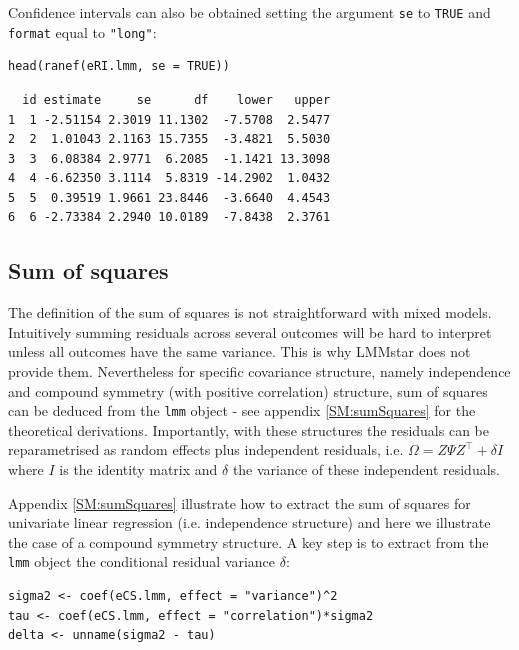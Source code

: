 \documentclass[12pt]{article}
\newcommand\Warning[1][3ex]{%
\renewcommand\stacktype{L}%
\scaleto{\stackon[1.3pt]{\color{red}$\triangle$}{\tiny\bfseries !}}{#1}%
\xspace
}
\newcommand\trans[1]{{#1}^\intercal}%
\begin{document}
Confidence intervals can also be obtained setting the argument \texttt{se} to
\texttt{TRUE} and \texttt{format} equal to \texttt{"long"}:
\lstset{language=r,label= ,caption= ,captionpos=b,numbers=none}
\begin{lstlisting}
head(ranef(eRI.lmm, se = TRUE))
\end{lstlisting}

\begin{verbatim}
  id estimate     se      df    lower   upper
1  1 -2.51154 2.3019 11.1302  -7.5708  2.5477
2  2  1.01043 2.1163 15.7355  -3.4821  5.5030
3  3  6.08384 2.9771  6.2085  -1.1421 13.3098
4  4 -6.62350 3.1114  5.8319 -14.2902  1.0432
5  5  0.39519 1.9661 23.8446  -3.6640  4.4543
6  6 -2.73384 2.2940 10.0189  -7.8438  2.3761
\end{verbatim}


\clearpage

\subsection{Sum of squares}
\label{sec:orgc3a2f58}

\Warning The definition of the sum of squares is not straightforward with mixed
models. Intuitively summing residuals across several outcomes will be
hard to interpret unless all outcomes have the same variance. This is
why LMMstar does not provide them. Nevertheless for specific
covariance structure, namely independence and compound symmetry (with
positive correlation) structure, sum of squares can be deduced from
the \texttt{lmm} object - see appendix \ref{SM:sumSquares} for the theoretical
derivations. Importantly, with these structures the residuals can be
reparametrised as random effects plus independent residuals,
i.e. \(\Omega = Z \Psi \trans{Z} + \delta I\) where \(I\) is the
identity matrix and \(\delta\) the variance of these independent
residuals.

\bigskip

Appendix \ref{SM:sumSquares} illustrate how to extract the sum of squares
for univariate linear regression (i.e. independence structure) and
here we illustrate the case of a compound symmetry structure.  A key
step is to extract from the \texttt{lmm} object the conditional residual variance
\(\delta\):
\lstset{language=r,label= ,caption= ,captionpos=b,numbers=none}
\begin{lstlisting}
sigma2 <- coef(eCS.lmm, effect = "variance")^2
tau <- coef(eCS.lmm, effect = "correlation")*sigma2
delta <- unname(sigma2 - tau)
\end{lstlisting}
\end{document}
